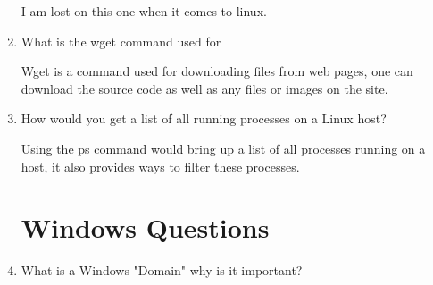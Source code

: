\documentclass{exam}
\begin{document}
\begin{enumerate}
	\begin{solution}
		I am lost on this one when it comes to linux. 
	\end{solution}
	\item  What is the wget command used for 
	\begin{solution}
		Wget is a command used for downloading files from web pages, one can download the source code as well as any files or images on the site. 
	\end{solution}
	\item How would you get a list of all running processes on a Linux host?
	\begin{solution}
		Using the ps command would bring up a list of all processes running on a host, it also provides ways to filter these processes. 
	\end{solution}
	\section*{Windows Questions}
	\item What is a Windows "Domain" why is it important?
	
	\end{enumerate}
\end{document}
